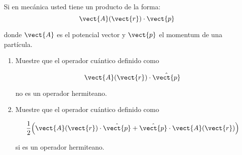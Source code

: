 \documentclass[../main.tex]{subfiles}
\begin{document}
\begin{problema}[20]
	Si en mecánica usted tiene un producto de la forma:
	\begin{equation*}
		\vect{A}(\vect{r})\cdot \vect{p}
	\end{equation*}

	donde \(\vect{A}\) es el potencial vector y \(\vect{p}\) el
	momentum de una partícula.

	\begin{enumerate}
		\item Muestre que el operador cuántico definido como

		      \begin{equation*}
			      \vect{A}(\vect{r})\cdot \hat{\vect{p}}
		      \end{equation*}

		      no es un operador hermiteano.
		\item Muestre que el operador cuántico definido como

		      \begin{equation*}
			      \dfrac{1}{2}\Bigl(\vect{A}(\vect{r})\cdot \hat{\vect{p}} + \hat{\vect{p}}\cdot \vect{A}(\vect{r})\Bigr)
		      \end{equation*}

		      si es un operador hermiteano.
	\end{enumerate}
\end{problema}
\end{document}
